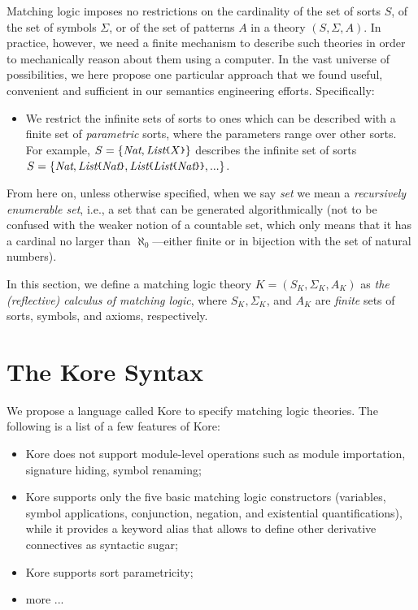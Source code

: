 \documentclass[UTF8,11pt]{article}
\theoremstyle{plain}
\theoremstyle{definition}
\theoremstyle{remark}
\newcommand{\Nat}{\textit{Nat}}
\newcommand{\List}{\textit{List}}
\newcommand{\parametric}[2]{{#1}\raisebox{.2ex}{\texttt{\footnotesize{\{}}}#2\raisebox{.2ex}{\texttt{\footnotesize{\}}}}}
\begin{document}
Matching logic imposes no restrictions on the cardinality of the set of
sorts $S$, of the set of symbols $\Sigma$, or of the set of patterns $A$
in a theory $(S,\Sigma,A)$.
In practice, however, we need a finite mechanism to describe such theories
in order to mechanically reason about them using a computer.
In the vast universe of possibilities, we here propose one particular approach
that we found useful, convenient and sufficient in our semantics engineering
efforts.
Specifically:
\begin{itemize}
\item
We restrict the infinite sets of sorts to ones which can be described with
a finite set of \emph{parametric} sorts, where the parameters range over
other sorts.
For example, $S=\{\Nat,\parametric{\List}{X}\}$ describes the infinite set
of sorts
$S=\{\Nat, \parametric{\List}{\Nat}, \parametric{\List}{\parametric{\List}{\Nat}}, ...\}$.

\end{itemize}

From here on, unless otherwise specified, when we say \emph{set} we mean
a \emph{recursively enumerable set}, i.e., a set that can be generated
algorithmically (not to be confused with the weaker notion of a
countable
set, which only means that it has a cardinal no larger than
$\aleph_0$---either finite or in bijection with the set
of natural numbers).


In this section, we define a matching logic theory $K = (S_K, \Sigma_K, A_K)$ 
as \emph{the (reflective) calculus of matching logic},
where $S_K, \Sigma_K$, and $A_K$ are \emph{finite} sets of sorts,
symbols, and axioms,  respectively.



\section{The Kore Syntax}

We propose a language called Kore to specify matching logic theories.
The following is a list of a few features of Kore:
\begin{itemize}
	\item Kore does not support module-level operations such as module importation, 
	signature hiding, symbol renaming;
	\item Kore supports only the five basic matching logic constructors 
	(variables, symbol applications, conjunction, negation, and existential 
	quantifications), while it provides a keyword \textsf{alias} that allows to define other derivative connectives as syntactic sugar;
	\item Kore supports sort parametricity;
	\item more ...
\end{itemize}
\end{document}

